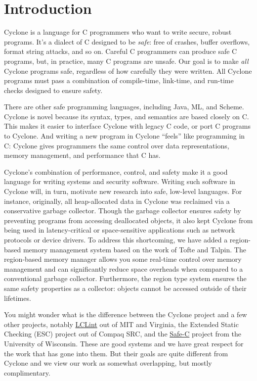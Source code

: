 \section{Introduction}
Cyclone is a language for C programmers who want to write secure,
robust programs.  It's a dialect of C designed to be \emph{safe}: free
of crashes, buffer overflows, format string attacks, and so on.
Careful C programmers can produce safe C programs, but, in practice,
many C programs are unsafe.  Our goal is to make \emph{all} Cyclone
programs safe, regardless of how carefully they were written.  All
Cyclone programs must pass a combination of compile-time, link-time,
and run-time checks designed to ensure safety.

There are other safe programming languages, including Java, ML, and
Scheme.  Cyclone is novel because its syntax, types, and semantics are
based closely on C\@.  This makes it easier to interface Cyclone with
legacy C code, or port C programs to Cyclone.  And writing a new
program in Cyclone ``feels'' like programming in C: Cyclone gives
programmers the same control over data representations, memory
management, and performance that C has.

Cyclone's combination of performance, control, and safety make it a
good language for writing systems and security software.  Writing such
software in Cyclone will, in turn, motivate new research into safe,
low-level languages.  For instance, originally, all heap-allocated
data in Cyclone was reclaimed via a conservative garbage collector.
Though the garbage collector ensures safety by preventing programs
from accessing deallocated objects, it also kept Cyclone from being
used in latency-critical or space-sensitive applications such as
network protocols or device drivers.  To address this shortcoming, we
have added a region-based memory management system based on the work
of Tofte and Talpin.  The region-based memory manager allows you some
real-time control over memory management and can significantly reduce
space overheads when compared to a conventional garbage collector.
Furthermore, the region type system ensures the same safety properties
as a collector: objects cannot be accessed outside of their lifetimes.

You might wonder what is the difference between the Cyclone project
and a few other projects, notably
\href{http://lclint.cs.virginia.edu/}{LCLint} out of MIT and Virginia,
the Extended Static Checking (ESC) project out of Compaq SRC, and the
\href{http://www.cs.wisc.edu/~austin/scc.html}{Safe-C} project from
the University of Wisconsin.  These are good systems and we have great
respect for the work that has gone into them.  But their goals are
quite different from Cyclone and we view our work as somewhat
overlapping, but mostly complimentary.

